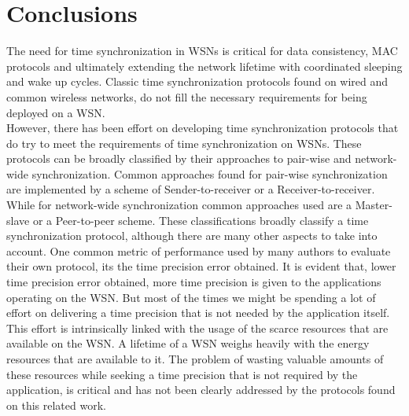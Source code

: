 \chapter{Conclusions}

The need for time synchronization in WSNs is critical for data consistency, MAC protocols and ultimately extending the network lifetime with coordinated sleeping and wake up cycles. Classic time synchronization protocols found on wired and common wireless networks, do not fill the necessary requirements for being deployed on a WSN.\\

However, there has been effort on developing time synchronization protocols that do try to meet the requirements of time synchronization on WSNs. These protocols can be broadly classified by their approaches to pair-wise and network-wide synchronization. Common approaches found for pair-wise synchronization are implemented by a scheme of Sender-to-receiver or a Receiver-to-receiver. While for network-wide synchronization common approaches used are a Master-slave or a Peer-to-peer scheme. These classifications broadly classify a time synchronization protocol, although there are many other aspects to take into account. One common metric of performance used by many authors to evaluate their own protocol, its the time precision error obtained. It is evident that, lower time precision error obtained, more time precision is given to the applications operating on the WSN. But most of the times we might be spending a lot of effort on delivering a time precision that is not needed by the application itself. This effort is intrinsically linked with the usage of the scarce resources that are available on the WSN. A lifetime of a WSN weighs heavily with the energy resources that are available to it. The problem of wasting valuable amounts of these resources while seeking a time precision that is not required by the application, is critical and has not been clearly addressed by the protocols found on this related work.\\

